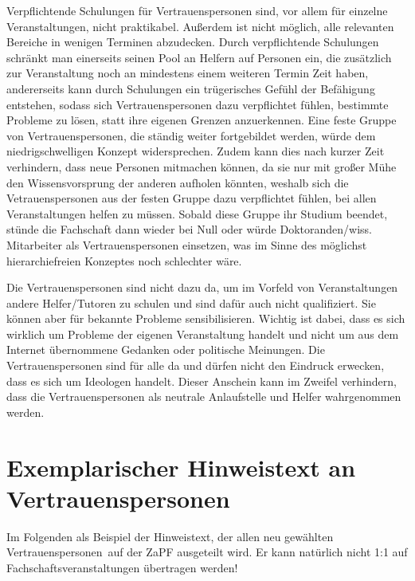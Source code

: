 \documentclass[DIV=calc]{scrartcl}
\newcommand{\vpen}{Vertrauenspersonen~}
\begin{document}
Verpflichtende Schulungen für Vertrauenspersonen sind, vor allem für einzelne Veranstaltungen, nicht praktikabel. Außerdem ist nicht möglich, alle relevanten Bereiche in wenigen Terminen abzudecken. Durch verpflichtende Schulungen schränkt man einerseits seinen Pool an Helfern auf Personen ein, die zusätzlich zur Veranstaltung noch an mindestens einem weiteren Termin Zeit haben, andererseits kann durch Schulungen ein trügerisches Gefühl der Befähigung entstehen, sodass sich Vertrauenspersonen dazu verpflichtet fühlen, bestimmte Probleme zu lösen, statt ihre eigenen Grenzen anzuerkennen.
Eine feste Gruppe von Vertrauenspersonen, die ständig weiter fortgebildet werden, würde dem niedrigschwelligen Konzept widersprechen. Zudem kann dies nach kurzer Zeit verhindern, dass neue Personen mitmachen können, da sie nur mit großer Mühe den Wissensvorsprung der anderen aufholen könnten, weshalb sich die Vetrauenspersonen aus der festen Gruppe dazu verpflichtet fühlen, bei allen Veranstaltungen helfen zu müssen. Sobald diese Gruppe ihr Studium beendet, stünde die Fachschaft dann wieder bei Null oder würde Doktoranden/wiss. Mitarbeiter als Vertrauenspersonen einsetzen, was im Sinne des möglichst hierarchiefreien Konzeptes noch schlechter wäre.

Die Vertrauenspersonen sind nicht dazu da, um im Vorfeld von Veranstaltungen andere Helfer/Tutoren zu schulen und sind dafür auch nicht qualifiziert. Sie können aber für bekannte Probleme sensibilisieren. Wichtig ist dabei, dass es sich wirklich um Probleme der eigenen Veranstaltung handelt und nicht um aus dem Internet übernommene Gedanken oder politische Meinungen. Die Vertrauenspersonen sind für alle da und dürfen nicht den Eindruck erwecken, dass es sich um Ideologen handelt. Dieser Anschein kann im Zweifel verhindern, dass die Vertrauenspersonen als neutrale Anlaufstelle und Helfer wahrgenommen werden.

\clearpage


\newpage

\appendix

\section{Exemplarischer Hinweistext an \vpen}
Im Folgenden als Beispiel der Hinweistext, der allen neu gewählten \vpen auf der ZaPF ausgeteilt wird. Er kann natürlich nicht 1:1 auf Fachschaftsveranstaltungen übertragen werden!
\end{document}
